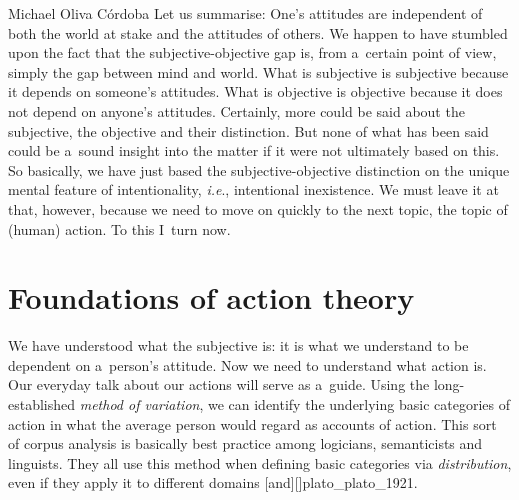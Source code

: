 \begin{artengenv}{Michael Oliva Córdoba}
Let us summarise: One's attitudes are independent of both the world at stake and the attitudes of others. We happen to have stumbled upon the fact that the subjective-objective gap is, from a~certain point of view, simply the gap between mind and world. What is subjective is subjective because it depends on someone's attitudes. What is objective is objective because it does not depend on anyone's attitudes. Certainly, more could be said about the subjective, the objective and their distinction. But none of what has been said could be a~sound insight into the matter if it were not ultimately based on this. So basically, we have just based the subjective-objective distinction on the unique mental feature of intentionality, \textit{i.e}., intentional inexistence. We must leave it at that, however, because we need to move on quickly to the next topic, the topic of (human) action. To this I~turn now.



\section{Foundations of action theory}


We have understood what the subjective is: it is what we understand to be dependent on a~person's attitude. Now we need to understand what action is. Our everyday talk about our actions will serve as a~guide. Using the long-established \textit{method of variation}, we can identify the underlying basic categories of action in what the average person would regard as accounts of action. This sort of corpus analysis is basically best practice among logicians, semanticists and linguists. They all use this method when defining basic categories via \textit{distribution}, even if they apply it to different domains 
\parencites[see, e.g.,][p.46]{burton-roberts_analysing_2016}[][p.34]{tallerman_understanding_2015}[][p.20ff]{lewis_general_1970}[][p.147]{lyons_introduction_1968}[][p.3]{ajdukiewicz_syntaktische_1935}[][p.242]{husserl_prolegomena_1913}[all anticipated by][]{frege_function_1891}[Engl. transl.][p.189]{frege_function_1960}[and][]{plato_plato_1921}.%
 




\end{artengenv}
